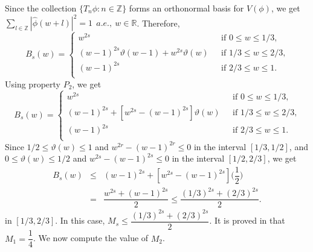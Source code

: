 \documentclass[a4paper,12pt,reqno]{amsart}
\theoremstyle{plain}
\numberwithin{equation}{section}
\theoremstyle{definition}
\begin{document}
Since the collection $\{T_n\phi:n\in\mathbb{Z}\}$ forms an
orthonormal basis for $V(\phi)$, we get
$\sum\limits_{l\in\mathbb{Z}}|\widehat{\phi}(w+l)|^2=1 ~~a.e.,~w\in\mathbb{R}$.
Therefore, 
\begin{equation*}
B_s(w)= \left\{\begin{array}{cc}
w^{2s}& \mbox{~~if $0\leq w\leq 1/3$,}\\
(w-1)^{2s}\vartheta(w-1)+ w^{2s}\vartheta(w)&\mbox{~~if $1/3\leq w\leq 2/3$,}\\
(w-1)^{2s}&\mbox{~~if $2/3\leq w\leq 1$.}\\
\end{array} \right.
\end{equation*}
Using property $P_2$, we get
\begin{equation*}
B_s(w)= \left\{\begin{array}{cc}
w^{2s}& \mbox{~~if $0\leq w\leq 1/3$,}\\
(w-1)^{2s}+[w^{2s}-(w-1)^{2s}]\vartheta(w)&\mbox{~~if $1/3\leq w\leq 2/3$,}\\
(w-1)^{2s}&\mbox{~~if $2/3\leq w\leq 1$.}\\
\end{array} \right.
\end{equation*}
Since  $1/2\leq\vartheta(w)\leq1$ and $w^{2r}-(w-1)^{2r}\leq 0$ in the interval $[1/3,1/2]$, and $0\leq\vartheta(w)\leq1/2$ and $w^{2s}-(w-1)^{2s}\leq0$ in the interval $[1/2,2/3]$, we get
\begin{eqnarray*}
B_s(w)&\leq&(w-1)^{2s}+[w^{2s}-(w-1)^{2s}]\Big(\dfrac{1}{2}\Big)\\
&=&\dfrac{w^{2s}+(w-1)^{2s}}{2}\leq\dfrac{(1/3)^{2s}+(2/3)^{2s}}{2}.
\end{eqnarray*}
in $[1/3,2/3]$. In this case, $M_s\leq\dfrac{(1/3)^{2s}+(2/3)^{2s}}{2}$.
It is proved in \cite{AntoRad3} that $M_1=\dfrac{1}{4}$.
We now compute the value of $M_2$.
\end{document}
